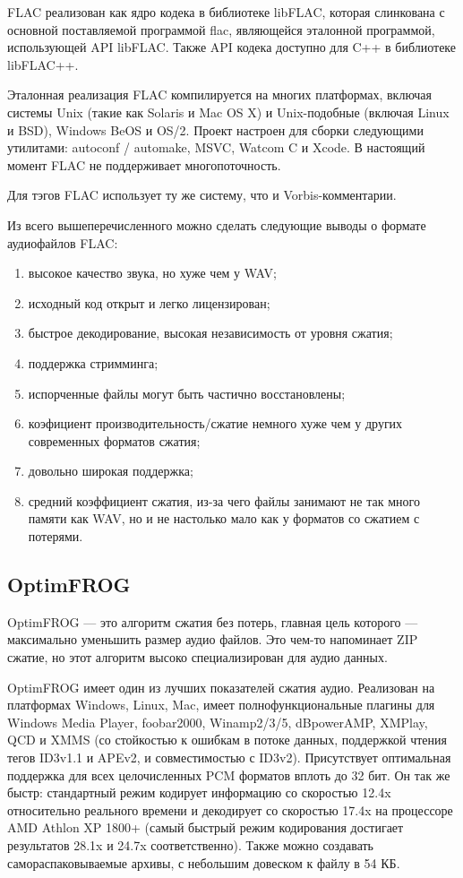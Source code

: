 \documentclass[12pt,a4paper,oneside]{report}
\begin{document}
FLAC реализован как ядро кодека в библиотеке libFLAC, которая слинкована с основной поставляемой программой flac, являющейся эталонной программой, использующей API libFLAC. Также API кодека доступно для C++ в библиотеке libFLAC++.

Эталонная реализация FLAC компилируется на многих платформах, включая системы Unix (такие как Solaris и Mac OS X) и Unix-подобные (включая Linux и BSD), Windows BeOS и OS/2. Проект настроен для сборки следующими утилитами: autoconf / automake, MSVC, Watcom C и Xcode. В настоящий момент FLAC не поддерживает многопоточность.

Для тэгов FLAC использует ту же систему, что и Vorbis-комментарии.

Из всего вышеперечисленного можно сделать следующие выводы о формате аудиофайлов FLAC:
\begin{enumerate}
	\item высокое качество звука, но хуже чем у WAV;
	\item исходный код открыт и легко лицензирован;
	\item быстрое декодирование, высокая независимость от уровня сжатия;
	\item поддержка стримминга;
	\item испорченные файлы могут быть частично восстановлены;
	\item коэфициент производительность/сжатие немного хуже чем у других современных форматов сжатия;
	\item довольно широкая поддержка;
	\item средний коэффициент сжатия, из-за чего файлы занимают не так много памяти как WAV, но и не настолько мало как у форматов со сжатием с потерями.
\end{enumerate}
\subsection{OptimFROG}
OptimFROG — это алгоритм сжатия без потерь, главная цель которого — максимально уменьшить размер аудио файлов. Это чем-то напоминает ZIP сжатие, но этот алгоритм высоко специализирован для аудио данных.

OptimFROG имеет один из лучших показателей сжатия аудио. Реализован на платформах Windows, Linux, Mac, имеет полнофункциональные плагины для Windows Media Player, foobar2000, Winamp2/3/5, dBpowerAMP, XMPlay, QCD и XMMS (со стойкостью к ошибкам в потоке данных, поддержкой чтения тегов ID3v1.1 и APEv2, и совместимостью с ID3v2). Присутствует оптимальная поддержка для всех целочисленных PCM форматов вплоть до 32 бит. Он так же быстр: стандартный режим кодирует информацию со скоростью 12.4x относительно реального времени и декодирует со скоростью 17.4x на процессоре AMD Athlon XP 1800+ (самый быстрый режим кодирования достигает результатов 28.1x и 24.7x соответственно). Также можно создавать самораспаковываемые архивы, с небольшим довеском к файлу в 54 КБ.
\end{document}
